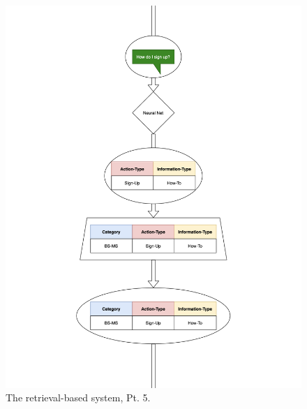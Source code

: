 \documentclass[titlepage, 12pt]{article}
\begin{document}
\begin{figure}[p]
    \centering\includegraphics[width=1\linewidth]{images/retrieval-5.png}
    \caption{The retrieval-based system, Pt. 5.}
\end{figure}
\end{document}
